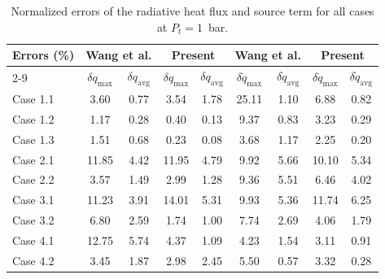 \begin{table}[htbp]
\centering
\caption{Normalized errors of the radiative heat flux and source term for all cases at $P_t = 1$~bar.}
\label{tab:error_summary}
\begin{tabular}{lcccccccc}
\hline
\multirow{2}{*}{Errors (\%)} 
 & \multicolumn{2}{c}{Wang et al.} 
 & \multicolumn{2}{c}{Present} 
 & \multicolumn{2}{c}{Wang et al.} 
 & \multicolumn{2}{c}{Present} \\
 \cline{2-9}
 & $\delta q_{\max}$ & $\delta q_{\mathrm{avg}}$ & $\delta q_{\max}$ & $\delta q_{\mathrm{avg}}$ & $\delta \dot{q}_{\max}$ & $\delta \dot{q}_{\mathrm{avg}}$ & $\delta \dot{q}_{\max}$ & $\delta \dot{q}_{\mathrm{avg}}$ \\
\hline
Case 1.1 & 3.60  & 0.77 & 3.54  & 1.78 & 25.11 & 1.10 & 6.88  & 0.82 \\
Case 1.2 & 1.17  & 0.28 & 0.40  & 0.13 & 9.37  & 0.83 & 3.23  & 0.29 \\
Case 1.3 & 1.51  & 0.68 & 0.23  & 0.08 & 3.68  & 1.17 & 2.25  & 0.20 \\
Case 2.1 & 11.85 & 4.42 & 11.95 & 4.79 & 9.92  & 5.66 & 10.10 & 5.34 \\
Case 2.2 & 3.57  & 1.49 & 2.99  & 1.28 & 9.36  & 5.51 & 6.46  & 4.02 \\
Case 3.1 & 11.23 & 3.91 & 14.01 & 5.31 & 9.93  & 5.36 & 11.74 & 6.25 \\
Case 3.2 & 6.80  & 2.59 & 1.74  & 1.00 & 7.74  & 2.69 & 4.06  & 1.79 \\
Case 4.1 & 12.75 & 5.74 & 4.37  & 1.09 & 4.23  & 1.54 & 3.11  & 0.91 \\
Case 4.2 & 3.45  & 1.87 & 2.98  & 2.45 & 5.50  & 0.57 & 3.32  & 0.28 \\
\hline
\end{tabular}
\end{table}
